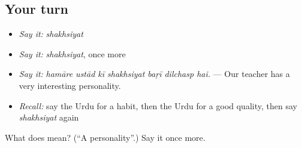 \subsection*{Your turn}
\begin{itemize}
\raggedright
  \item \emph{Say it:} \emph{shakhsiyat}
  \item \emph{Say it:} \emph{shakhsiyat}, once more
  \item \emph{Say it:} \emph{hamāre ustād kī shakhsiyat baṛī dilchasp hai.} — Our teacher has a very interesting personality.
  \item \emph{Recall:} say the Urdu for a habit, then the Urdu for a good quality, then say \emph{shakhsiyat} again
\end{itemize}

\begin{tcolorbox}[breakable,colback=teal!4,colframe=teal!35!black,title={Before you move on}]
What does  mean? (\textquotedblleft{}A personality\textquotedblright{}.) Say it once more.
\end{tcolorbox}
